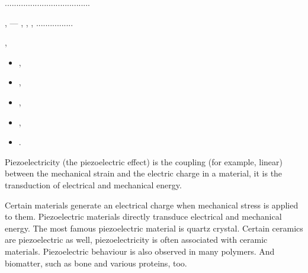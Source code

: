 .....................................

,
\:---
,
,
,
................

,
\begin{itemize}
\item {},
\item {},
\item {},
\item {},
\item {}.
\end{itemize}

Piezoelectricity (the piezoelectric effect) is the coupling (for example, linear) between the mechanical strain and the electric charge in a material,
it is the transduction of electrical and mechanical energy.

Certain materials generate an electrical charge when mechanical stress is applied to them.
Piezoelectric materials directly transduce electrical and mechanical energy.
The most famous piezoelectric material is quartz crystal.
Certain ceramics are piezoelectric as well, piezoelectricity is often associated with ceramic materials.
Piezoelectric behaviour is also observed in many polymers.
And biomatter, such as bone and various proteins, too.


